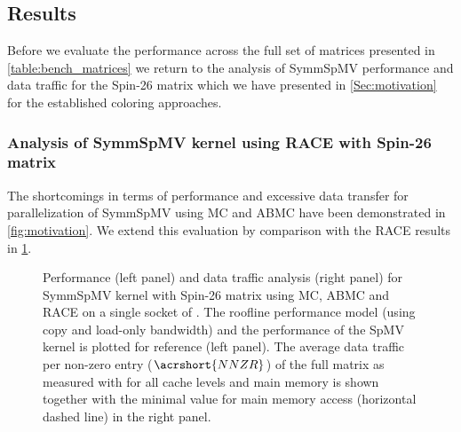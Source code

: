 \subsection{Results}
Before we evaluate the performance across the full set of matrices presented in \cref{table:bench_matrices} we return to the analysis of \acrshort{SymmSpMV} performance and data traffic for the Spin-26 matrix  which we have presented in \cref{Sec:motivation} for the established coloring approaches. 
%
\subsubsection{Analysis of \acrshort{SymmSpMV} kernel using RACE with Spin-26 matrix}
\label{Sec:Spin26full}
%
The shortcomings in terms of performance and excessive data transfer for parallelization of \acrshort{SymmSpMV} using MC and ABMC have been demonstrated in \cref{fig:motivation}. We extend this evaluation by comparison with the \acrshort{RACE} results in \cref{fig:motivation_w_RACE}.
 \begin{figure}[thbp]
 	\centering
 	\hspace{1em}
 	\caption{Performance (left panel) and data traffic analysis (right panel) for \acrshort{SymmSpMV} kernel with Spin-26 matrix using \acrshort{MC}, \acrshort{ABMC} and \acrshort{RACE} on a single socket of \IVB. The roofline performance model (using copy and load-only bandwidth) and the performance of the \acrshort{SpMV} kernel is plotted for reference (left panel). The average data traffic per non-zero entry ($\acrshort{NNZR}$) of the full matrix as measured with \LIKWID for all cache levels and main memory is shown together with the minimal value for main memory access (horizontal dashed line) in the right panel.}
 	\label{fig:motivation_w_RACE}
 \end{figure}
